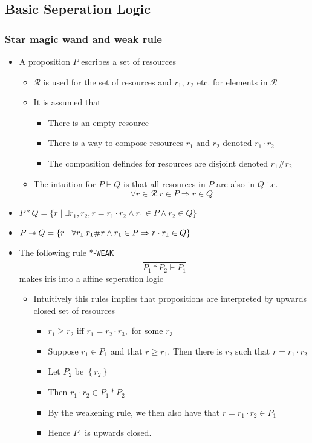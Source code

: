 \subsection{Basic Seperation Logic}
\subsubsection{Star magic wand and weak rule}
\begin{itemize}
  \item A proposition $P$ escribes a set of resources
  \begin{itemize}
  	\item $\mathcal R$ is used for the set of resources and $r_1$, $r_2$ etc. for elements in $\mathcal R$
    \item It is assumed that 
    \begin{itemize}
    	\item There is an empty resource
      \item There is a way to compose resources $r_1$ and $r_2$ denoted $r_1 \cdot r_2$
      \item The composition defindes for resources are disjoint denoted $r_1 \# r_2$
    \end{itemize}
  \item The intuition for $P \vdash Q$ is that all resources in $P$ are also in $Q$ i.e.
  \begin{equation*}
    \forall r \in \mathcal R. r \in P \Rightarrow r \in Q 
  \end{equation*}
  \end{itemize}
  \item $P*Q = \{r \mid \exists r_1, r_2, r= r_1 \cdot r_2 \land r_1 \in P \land r_2 \in Q \}$
  \item $P \magic Q = \{r \mid \forall r_1. r_1 \# r \land r_1 \in P \Rightarrow r \cdot r_1 \in Q\}$
  \item The following rule $*$-\texttt{WEAK}
  \begin{equation*}
    \frac{}{P_{1} * P_{2} \vdash P_{1}}
  \end{equation*}
  makes iris into a affine seperation logic
  \begin{itemize}
  	\item Intuitively this rules implies that propositions are interpreted by upwards closed set of resources
  \begin{itemize}
  	\item $r_{1} \geq r_{2}$ iff $r_{1}=r_{2} \cdot r_{3},$ for some $r_{3}$
    \item Suppose $r_{1} \in P_{1}$ and that $r \geq r_{1} .$ Then there is $r_{2}$ such that $r=r_{1} \cdot r_{2}$
    \item Let $P_{2}$ be $\left\{r_{2}\right\}$
    \item Then $r_{1} \cdot r_{2} \in P_{1} * P_{2}$
    \item By the weakening rule, we then also have that $r=r_{1} \cdot r_{2} \in P_{1}$
    \item Hence $P_{1}$ is upwards closed.
  \end{itemize}
  \end{itemize}
\end{itemize}


